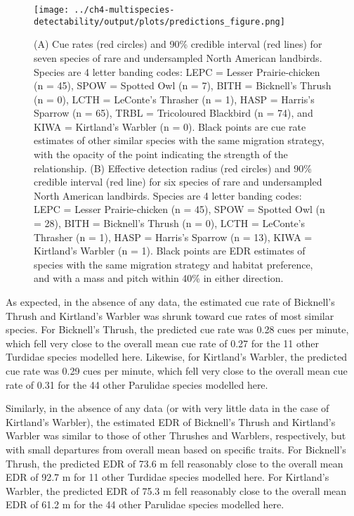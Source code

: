 \begin{figure}[hbtp]
	\texttt{[image: ../ch4-multispecies-detectability/output/plots/predictions\_figure.png]}
	\caption{(A) Cue rates (red circles) and 90\% credible interval (red lines) for seven species of rare and undersampled North American landbirds. Species are 4 letter banding codes: LEPC = Lesser Prairie-chicken (n = 45), SPOW = Spotted Owl (n = 7), BITH = Bicknell's Thrush (n = 0), LCTH = LeConte's Thrasher (n = 1), HASP = Harris's Sparrow (n = 65), TRBL = Tricoloured Blackbird (n = 74), and KIWA = Kirtland's Warbler (n = 0). Black points are cue rate estimates of other similar species with the same migration strategy, with the opacity of the point indicating the strength of the relationship. (B) Effective detection radius (red circles) and 90\% credible interval (red line) for six species of rare and undersampled North American landbirds. Species are 4 letter banding codes: LEPC = Lesser Prairie-chicken (n = 45), SPOW = Spotted Owl (n = 28), BITH = Bicknell's Thrush (n = 0), LCTH = LeConte's Thrasher (n = 1), HASP = Harris's Sparrow (n = 13), KIWA = Kirtland's Warbler (n = 1). Black points are EDR estimates of species with the same migration strategy and habitat preference, and with a mass and pitch within 40\% in either direction.}
	\label{fig:predictions}
\end{figure}

\par As expected, in the absence of any data, the estimated cue rate of Bicknell’s Thrush and Kirtland’s Warbler was shrunk toward cue rates of most similar species.
For Bicknell's Thrush, the predicted cue rate was 0.28 cues per minute, which fell very close to the overall mean cue rate of 0.27 for the 11 other Turdidae species modelled here.
Likewise, for Kirtland's Warbler, the predicted cue rate was 0.29 cues per minute, which fell very close to the overall mean cue rate of 0.31 for the 44 other Parulidae species modelled here.

\par Similarly, in the absence of any data (or with very little data in the case of Kirtland’s Warbler), the estimated EDR of Bicknell’s Thrush and Kirtland’s Warbler was similar to those of other Thrushes and Warblers, respectively, but with small departures from overall mean based on specific traits.
For Bicknell's Thrush, the predicted EDR of 73.6 m fell reasonably close to the overall mean EDR of 92.7 m for 11 other Turdidae species modelled here.
For Kirtland's Warbler, the predicted EDR of 75.3 m fell reasonably close to the overall mean EDR of 61.2 m for the 44 other Parulidae species modelled here.

